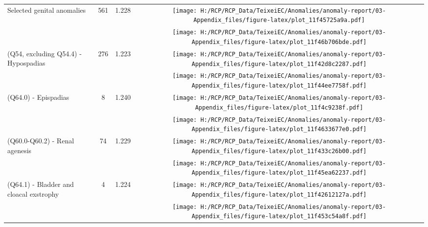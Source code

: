 \documentclass[
]{krantz}
\begin{document}
\begin{longtable}[t]{>{\raggedright\arraybackslash}m{4cm}cc>{}c}
Selected genital anomalies & 561 & 1.228 & \texttt{[image: H:/RCP/RCP\_Data/TeixeiEC/Anomalies/anomaly-report/03-Appendix\_files/figure-latex/plot\_11f45725a9a.pdf]}\\
\addlinespace
\cellcolor{gray!6}{(Q53.1, Q53.2, Q53.9) - Cryptorchidism / undescended testicles} & \cellcolor{gray!6}{262} & \cellcolor{gray!6}{1.232} & \cellcolor{gray!6}{}\texttt{[image: H:/RCP/RCP\_Data/TeixeiEC/Anomalies/anomaly-report/03-Appendix\_files/figure-latex/plot\_11f46b706bde.pdf]}\\
(Q54, excluding Q54.4) - Hypospadias & 276 & 1.223 & \texttt{[image: H:/RCP/RCP\_Data/TeixeiEC/Anomalies/anomaly-report/03-Appendix\_files/figure-latex/plot\_11f42d8c2287.pdf]}\\
\cellcolor{gray!6}{(Q56) - Indeterminate sex} & \cellcolor{gray!6}{24} & \cellcolor{gray!6}{1.237} & \cellcolor{gray!6}{}\texttt{[image: H:/RCP/RCP\_Data/TeixeiEC/Anomalies/anomaly-report/03-Appendix\_files/figure-latex/plot\_11f44ee7758f.pdf]}\\
(Q64.0) - Epispadias & 8 & 1.240 & \texttt{[image: H:/RCP/RCP\_Data/TeixeiEC/Anomalies/anomaly-report/03-Appendix\_files/figure-latex/plot\_11f4c9238f.pdf]}\\
\cellcolor{gray!6}{Selected urinary tract defects} & \cellcolor{gray!6}{163} & \cellcolor{gray!6}{1.228} & \cellcolor{gray!6}{}\texttt{[image: H:/RCP/RCP\_Data/TeixeiEC/Anomalies/anomaly-report/03-Appendix\_files/figure-latex/plot\_11f4633677e0.pdf]}\\
\addlinespace
(Q60.0-Q60.2) - Renal agenesis & 74 & 1.229 & \texttt{[image: H:/RCP/RCP\_Data/TeixeiEC/Anomalies/anomaly-report/03-Appendix\_files/figure-latex/plot\_11f433c26b00.pdf]}\\
\cellcolor{gray!6}{(Q61.1-Q61.5, Q61.8, Q61.9) - Cystic kidney} & \cellcolor{gray!6}{79} & \cellcolor{gray!6}{1.227} & \cellcolor{gray!6}{}\texttt{[image: H:/RCP/RCP\_Data/TeixeiEC/Anomalies/anomaly-report/03-Appendix\_files/figure-latex/plot\_11f45ea62237.pdf]}\\
(Q64.1) - Bladder and cloacal exstrophy & 4 & 1.224 & \texttt{[image: H:/RCP/RCP\_Data/TeixeiEC/Anomalies/anomaly-report/03-Appendix\_files/figure-latex/plot\_11f42612127a.pdf]}\\
\cellcolor{gray!6}{(Q64.2, Q64.3) - Lower urinary tract obstruction} & \cellcolor{gray!6}{20} & \cellcolor{gray!6}{1.222} & \cellcolor{gray!6}{}\texttt{[image: H:/RCP/RCP\_Data/TeixeiEC/Anomalies/anomaly-report/03-Appendix\_files/figure-latex/plot\_11f453c54a8f.pdf]}\\

\end{longtable}
\end{document}

